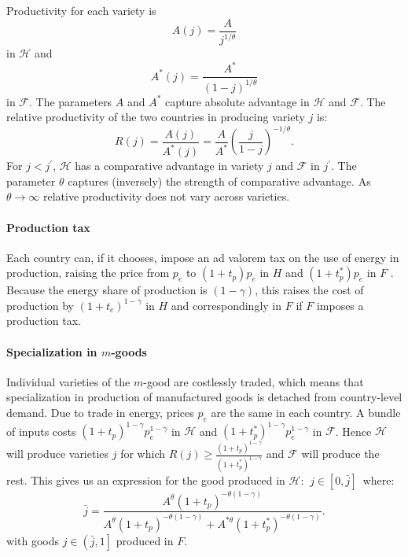 \documentclass[notitlepage,12pt]{article}
\begin{document}
Productivity for each variety is%
\begin{equation*}
A(j)=\frac{A}{j^{1/\theta }}
\end{equation*}%
in $\mathcal{H}$ and%
\begin{equation*}
A^{\ast }(j)=\frac{A^{\ast }}{\left( 1-j\right) ^{1/\theta }}
\end{equation*}%
in $\mathcal{F}$. The parameters $A$ and $A^{\ast }$ capture absolute
advantage in $\mathcal{H}$ and $\mathcal{F}$. The relative productivity of
the two countries in producing variety $j$ is:%
\begin{equation}
R(j)=\frac{A(j)}{A^{\ast }(j)}=\frac{A}{A^{\ast }}\left( \frac{j}{1-j}%
\right) ^{-1/\theta }.  \label{relative productivity}
\end{equation}%
For $j<j^{\prime }$, $\mathcal{H}$ has a comparative advantage in variety $j$
and $\mathcal{F}$ in $j^{\prime }$. The parameter $\theta $ captures
(inversely) the strength of comparative advantage. As $\theta \rightarrow
\infty $ relative productivity does not vary across varieties.

\paragraph{Production tax}

Each country can, if it chooses, impose an ad valorem tax on the use of
energy in production, raising the price from $p_{e}$ to $\left(
1+t_{p}\right) p_{e}$ in $H$ and $\left( 1+t_{p}^{\ast }\right) p_{e}$ in $F$%
. Because the energy share of production is $\left( 1-\gamma \right) $, this
raises the cost of production by $\left( 1+t_{e}\right) ^{1-\gamma }$ in $H$
and correspondingly in $F$ if $F$ imposes a production tax.

\paragraph{Specialization in $m$-goods}

Individual varieties of the $m$-good are costlessly traded, which means that
specialization in production of manufactured goods is detached from
country-level demand. Due to trade in energy, prices $p_{e}$ are the same in
each country. A bundle of inputs costs $\left( 1+t_{p}\right) ^{1-\gamma
}p_{e}^{1-\gamma }$ in $\mathcal{H}$ and $\left( 1+t_{p}^{\ast }\right)
^{1-\gamma }p_{e}^{1-\gamma }$ in $\mathcal{F}$. Hence $\mathcal{H}$ will
produce varieties $j$ for which $R(j)\geq \frac{\left( 1+t_{p}\right)
^{1-\gamma }}{\left( 1+t_{p}^{\ast }\right) ^{1-\gamma }}$ and $\mathcal{F}$
will produce the rest. This gives us an expression for the good produced in $%
\mathcal{H}$: $\ j\in \left[ 0,\bar{j}\right] $\ where:%
\begin{equation}
\bar{j}=\frac{A^{\theta }\left( 1+t_{p}\right) ^{-\theta \left( 1-\gamma
\right) }}{A^{\theta }\left( 1+t_{p}\right) ^{-\theta \left( 1-\gamma
\right) }+A^{\ast \theta }\left( 1+t_{p}^{\ast }\right) ^{-\theta \left(
1-\gamma \right) }}.  \label{jbar}
\end{equation}%
with goods $j\in \left( \bar{j},1\right] $ produced in $F$. 
\end{document}
